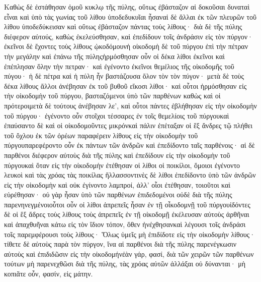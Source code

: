 Καθὼς δὲ ἐστάθησαν ὁμοῦ κυκλῳ τῆς πύλης, οὕτως ἐβάσταζον αἱ δοκοῦσαι δυναταὶ εἶναι καὶ ὑπὸ τὰς γωνίας τοῦ λίθου ὑποδεδυκυῖαι ἦσαναἱ δὲ ἄλλαι ἐκ τῶν πλευρῶν τοῦ λίθου ὑποδεδύκεισαν καὶ οὕτως ἐβάσταζον πάντας τοὺς λίθους· διὰ δὲ τῆς πύλης διέφερον αὐτούς, καθὼς ἐκελεύσθησαν, καὶ ἐπεδίδουν τοῖς ἀνδράσιν εἰς τὸν πύργον· ἐκεῖνοι δὲ ἔχοντες τοὺς λίθους ᾠκοδόμουνἡ οἰκοδομὴ δὲ τοῦ πύργου ἐπὶ τὴν πέτραν τὴν μεγάλην καὶ ἐπάνω τῆς πύληςἡρμόσθησαν οὖν οἱ δέκα λίθοι ἐκεῖνοι καὶ ἐπέπλησαν ὅλην τὴν πετραν· καὶ ἐγένοντο ἐκεῖνοι θεμέλιος τῆς οἰκοδομῆς τοῦ πύγου· ἡ δὲ πέτρα καὶ ἡ πύλη ἦν βαστάζουσα ὅλον τὸν τὸν πύγον· μετὰ δὲ τοὺς δέκα λίθους ἄλλοι ἀνέβησαν ἐκ τοῦ βυθοῦ εἴκοσι λίθοι· καὶ οὗτοι ἡρμόσθησαν εἰς τὴν οἰκοδομὴν τοῦ πύργου, βασταζόμενοι ὑπὸ τῶν παρθένων καθὼς καὶ οἱ πρότεροιμετὰ δὲ τούτους ἀνέβησαν λε’, καὶ οὗτοι πάντες ἐβλήθησαν εἰς τὴν οἰκοδομὴν τοῦ πύργου· ἐγένοντο οὖν στοῖχοι τέσσαρες ἐν τοῖς θεμελίοις τοῦ πύργουκαὶ ἐπαύσαντο δὲ καὶ οἱ οἰκοδομοῦντες μικρόνκαὶ πάλιν ἐπέταξαν οἱ ἓξ ἄνδρες τῷ πλήθει τοῦ ὄχλου ἐκ τῶν ὀρέων παραφέρειν λίθους εἰς τὴν οἰκοδομὴν τοῦ πύργουπαρεφέροντο οὖν ἐκ πάντων τῶν ἀνδρῶν καὶ ἐπεδίδοντο ταῖς παρθένοις· αἱ δὲ παρθένοι διέφερον αὐτοὺς διὰ τῆς πύλης καὶ ἐπεδίδουν εἰς τὴν οἰκοδομὴν τοῦ πύργουκαὶ ὅταν εἰς τὴν οἰκοδομὴν ἐτέθησαν οἱ λίθοι οἱ ποικίλοι, ὅμοιοι ἐγένοντο λευκοὶ καὶ τὰς χρόας τὰς ποικίλας ἤλλασσοντινὲς δὲ λίθοι ἐπεδίδοντο ὑπὸ τῶν ἀνδρῶν εἰς τὴν οἰκοδομὴν καὶ οὐκ ἐγίνοντο λαμπροί, ἀλλ’ οἷοι ἐτέθησαν, τοιοῦτοι καὶ εὑρέθησαν· οὐ γὰρ ἦσαν ὑπὸ τῶν παρθένων ἐπιδεδομένοι οὐδὲ διὰ τῆς πύλης παρενηνεγμένοιοὗτοι οὖν οἱ λίθοι ἀπρεπεῖς ἦσαν ἐν τῇ οἶκοδομνῇ τοῦ πύργουἰδόντες δὲ οἱ ἓξ ἄδρες τοὺς λίθους τοὺς ἀπρεπεῖς ἐν τῇ οἰκοδομῇ ἐκέλευσαν αὐτοὺς ἀρθῆναι καὶ ἀπαχθυῆναι κάτω εἰς τὸν ἴδιον τόπον, ὅθεν ἠνέχθησανκαὶ λέγουσι τοῖς ἀνδράσι τοῖς παρεμφέρουσι τοὺς λίθους· Ὅλως ὑμεῖς μὴ ἐπιδίδοτε εἰς τὴν οἰκοδομὴν λίθους· τίθετε δὲ αὐτοὺς παρὰ τὸν πύργον, ἵνα αἱ παρθένοι διὰ τῆς πύλης παρενέγκωσιν αὐτοὺς καὶ ἐπιδιδῶσιν εἰς τὴν οἰκοδομήνἐὰν γάρ, φασί, διὰ τῶν χειρῶν τῶν παρθένων τούτων μὴ παρενεχθῶσι διὰ τῆς πύλης, τὰς χρόας αὐτῶν ἀλλάξαι οὐ δύνανται· μὴ κοπιᾶτε οὖν, φασίν, εἰς μάτην.
